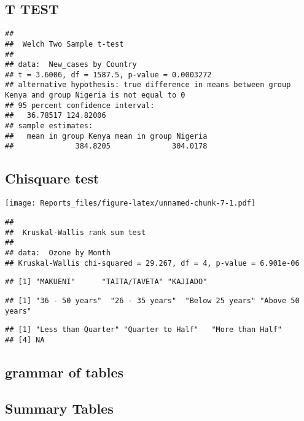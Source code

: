 \documentclass[
]{article}
\begin{document}
\hypertarget{t-test}{%
\subsection{T TEST}\label{t-test}}

\begin{verbatim}
## 
##  Welch Two Sample t-test
## 
## data:  New_cases by Country
## t = 3.6006, df = 1587.5, p-value = 0.0003272
## alternative hypothesis: true difference in means between group Kenya and group Nigeria is not equal to 0
## 95 percent confidence interval:
##   36.78517 124.82006
## sample estimates:
##   mean in group Kenya mean in group Nigeria 
##              384.8205              304.0178
\end{verbatim}

\hypertarget{chisquare-test}{%
\subsection{Chisquare test}\label{chisquare-test}}

\texttt{[image: Reports\_files/figure-latex/unnamed-chunk-7-1.pdf]}

\begin{verbatim}
## 
##  Kruskal-Wallis rank sum test
## 
## data:  Ozone by Month
## Kruskal-Wallis chi-squared = 29.267, df = 4, p-value = 6.901e-06
\end{verbatim}

\begin{verbatim}
## [1] "MAKUENI"      "TAITA/TAVETA" "KAJIADO"
\end{verbatim}

\begin{verbatim}
## [1] "36 - 50 years"  "26 - 35 years"  "Below 25 years" "Above 50 years"
\end{verbatim}

\begin{verbatim}
## [1] "Less than Quarter" "Quarter to Half"   "More than Half"   
## [4] NA
\end{verbatim}

\hypertarget{grammar-of-tables}{%
\subsection{grammar of tables}\label{grammar-of-tables}}

\hypertarget{summary-tables}{%
\subsection{Summary Tables}\label{summary-tables}}
\end{document}
